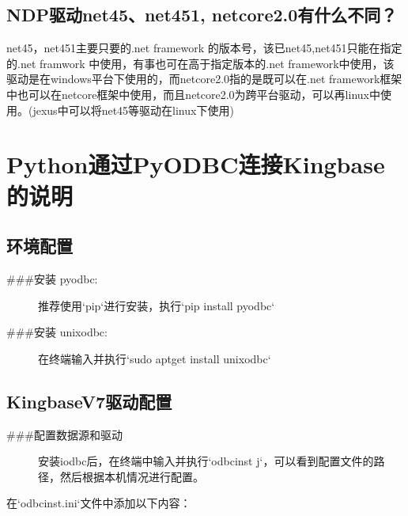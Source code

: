 \documentclass[letterpaper,10pt,english]{sphinxmanual}
\begin{document}
\subsection{NDP驱动net45、net451, netcore2.0有什么不同？}
\label{\detokenize{interface/C_:ndpnet45net451-netcore2-0}}
net45，net451主要只要的.net framework 的版本号，该已net45,net451只能在指定的.net framwork 中使用，有事也可在高于指定版本的.net framework中使用，该驱动是在windows平台下使用的，而netcore2.0指的是既可以在.net framework框架中也可以在netcore框架中使用，而且netcore2.0为跨平台驱动，可以再linux中使用。(jexus中可以将net45等驱动在linux下使用)


\section{Python通过PyODBC连接Kingbase的说明}
\label{\detokenize{interface/python:pythonpyodbckingbase}}\label{\detokenize{interface/python::doc}}

\subsection{环境配置}
\label{\detokenize{interface/python:id1}}\begin{description}
\item[{\#\#\#安装 pyodbc:}] \leavevmode
推荐使用`pip`进行安装，执行`pip install pyodbc`

\item[{\#\#\#安装 unixodbc:}] \leavevmode
在终端输入并执行`sudo apt\sphinxhyphen{}get install unixodbc`

\end{description}


\subsection{KingbaseV7驱动配置}
\label{\detokenize{interface/python:kingbasev7}}\begin{description}
\item[{\#\#\#配置数据源和驱动}] \leavevmode
安装iodbc后，在终端中输入并执行`odbcinst \sphinxhyphen{}j`，可以看到配置文件的路径，然后根据本机情况进行配置。

\end{description}

在`odbcinst.ini`文件中添加以下内容：

\begin{sphinxVerbatim}[commandchars=\\\{\}]
\PYG{p}{[}\PYG{p}{]}
   
    
  
\end{sphinxVerbatim}
\end{document}
